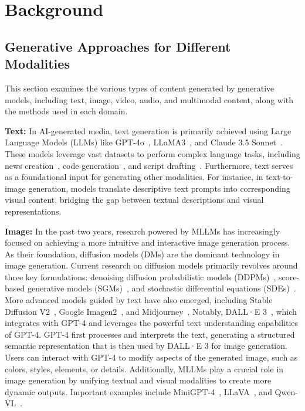 \section{Background}
\label{sec:back}

\subsection{Generative Approaches for Different Modalities}
This section examines the various types of content generated by generative models, including text, image, video, audio, and multimodal content, along with the methods used in each domain.

\textbf{Text:} 
In AI-generated media, text generation is primarily achieved using Large Language Models (LLMs) like GPT-4o~\cite{openai2024}, LLaMA3~\cite{dubey2024llama}, and Claude 3.5 Sonnet~\cite{anthropic2023claude3}. These models leverage vast datasets to perform complex language tasks, including news creation~\cite{kreps2022all}, code generation~\cite{idrisov2024program}, and script drafting~\cite{buschek2024collage}.
Furthermore, text serves as a foundational input for generating other modalities. For instance, in text-to-image generation, models translate descriptive text prompts into corresponding visual content, bridging the gap between textual descriptions and visual representations. 

\textbf{Image:} 
In the past two years, research powered by MLLMs has increasingly focused on achieving a more intuitive and interactive image generation process. As their foundation, diffusion models (DMs) are the dominant technology in image generation. Current research on diffusion models primarily revolves around three key formulations: denoising diffusion probabilistic models (DDPMs)~\cite{ho2020denoising}, score-based generative models (SGMs)~\cite{song2019generative}, and stochastic differential equations (SDEs)~\cite{song2020score}. More advanced models guided by text have also emerged, including Stable Diffusion V2~\cite{rombach2022high}, Google Imagen2~\cite{deepmind2023imagen2}, and Midjourney~\cite{midjourney2023}. Notably, DALL·E 3~\cite{betker2023improving}, which integrates with GPT-4 and leverages the powerful text understanding capabilities of GPT-4. GPT-4 first processes and interprets the text, generating a structured semantic representation that is then used by DALL·E 3 for image generation. Users can interact with GPT-4 to modify aspects of the generated image, such as colors, styles, elements, or details. Additionally, MLLMs play a crucial role in image generation by unifying textual and visual modalities to create more dynamic outputs. Important examples include MiniGPT-4~\cite{zhu2023minigpt}, LLaVA~\cite{liu2024visual}, and Qwen-VL~\cite{bai2023qwen}.

